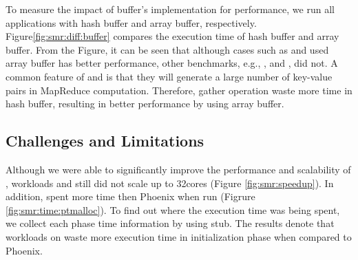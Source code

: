 To measure the impact of buffer's implementation for performance, we run all applications with hash buffer and array buffer, respectively.
Figure\ref{fig:smr:diff:buffer} compares the execution time of hash buffer and array buffer. 
From the Figure, it can be seen that although cases such as  and  used array buffer has better performance, other benchmarks, e.g., ,  and , did not.
A common feature of  and  is that they will generate a large number of key-value pairs in MapReduce computation.
Therefore, gather operation waste more time in hash buffer, resulting in better performance by using array buffer.


\subsection{ Challenges and Limitations}	
Although we were able to significantly improve the performance and scalability of \myds, 
workloads  and  still did not scale up to 32cores (Figure \ref{fig:smr:speedup}).
In addition, \myds spent more time then Phoenix when run  (Figrure \ref{fig:smr:time:ptmalloc}). 
To find out where the execution time was being spent, we collect each phase time information by using stub. 
The results denote that workloads on \myds waste more execution time in initialization phase when compared to Phoenix.

